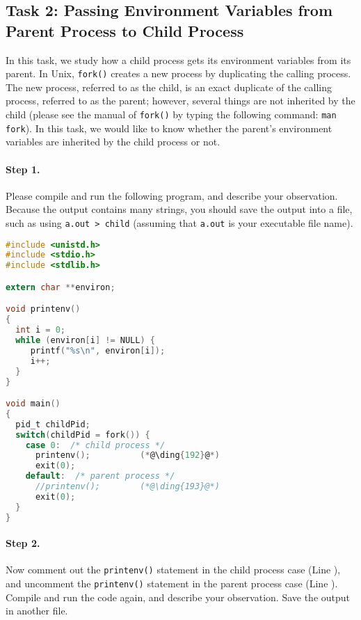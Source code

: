 \subsection{Task 2: Passing Environment Variables from Parent Process to Child Process}


In this task, we study how a child process gets
its environment variables from its parent. In Unix,
{\tt fork()} creates a new process by duplicating the calling process.
The new process, referred to as the child, is an exact duplicate of the calling
process, referred to as the parent; however, several things
are not inherited by the child (please see the manual of {\tt fork()} by
typing the following command: {\tt man fork}). In this task,
we would like to know whether the parent's environment variables
are inherited by the child process or not.


\paragraph{Step 1.} Please compile and run the following
program,  and describe your observation. Because the output
contains many strings, you should save the output into a file, such as
using {\tt a.out > child} (assuming that {\tt a.out} is your
executable file name).


\begin{lstlisting}[language=C]
#include <unistd.h>
#include <stdio.h>
#include <stdlib.h>

extern char **environ;

void printenv()
{
  int i = 0;
  while (environ[i] != NULL) {
     printf("%s\n", environ[i]);
     i++;
  }
}

void main()
{
  pid_t childPid;
  switch(childPid = fork()) {
    case 0:  /* child process */
      printenv();          (*@\ding{192}@*)
      exit(0);
    default:  /* parent process */
      //printenv();        (*@\ding{193}@*)
      exit(0);
  }
}
\end{lstlisting}

\paragraph{Step 2.} Now comment out the {\tt printenv()} statement in
the child process case (Line ),
and uncomment the {\tt printenv()} statement in
the parent process case (Line ).
Compile and run the code again, and describe your
observation. Save the output in another file.


